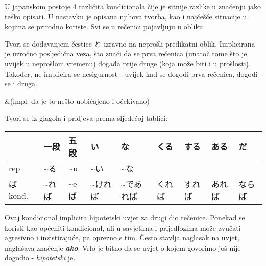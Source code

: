 
\author{Tomislav Mamić}


	
	U japanskom postoje 4 različita kondicionala čije je sitnije razlike u značenju jako teško opisati. U nastavku je opisana njihova tvorba, kao i najčešće situacije u kojima se prirodno koriste. Svi se u rečenici pojavljuju u obliku
	
	

	Tvori se dodavanjem čestice と izravno na neprošli predikatni oblik.	Implicirana je uzročno posljedična veza, što znači da se prva rečenica (unatoč tome što je uvijek u neprošlom vremenu) događa prije druge (koja može biti i u prošlosti). Također, ne implicira se nesigurnost - uvijek kad se dogodi prva rečenica, dogodi se i druga.
	
	\begin{reibun}
		&(impl. da je to nešto uobičajeno i očekivano)\\
	\end{reibun}

	
	Tvori se iz glagola i pridjeva prema sljedećoj tablici:
	
	\vspace{10pt}
	\begin{tabular}{|l|l|l|l|l|l|l|l|l|}
		\hline
		&一段&五段&い&な&くる&する&ある&だ\\\hline
		rep&\textasciitilde る&\textasciitilde u&\textasciitilde い&\textasciitilde な&&&&\\\hline
		ば kond.&\textasciitilde れば&\textasciitilde eば&\textasciitilde ければ&\textasciitilde であれば&くれば&すれば&あれば&ならば\\\hline
	\end{tabular}
	\vspace{10pt}

	Ovaj kondicional implicira hipotetski uvjet za drugi dio rečenice. Ponekad se koristi kao općeniti kondicional, ali u savjetima i prijedlozima može zvučati agresivno i inzistirajuće, pa oprezno s tim. Često stavlja naglasak na uvjet, naglašava značenje \textbf{\textit{ako}}. Vrlo je bitno da se uvjet o kojem govorimo još nije dogodio - \textit{hipotetski} je.
	
